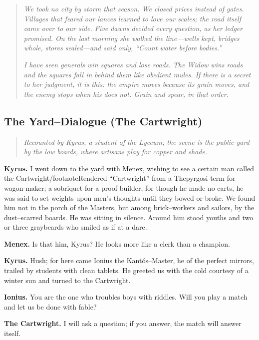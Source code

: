 \documentclass[11pt]{article}
\begin{document}
\begin{quote}
\emph{We took no city by storm that season. We closed prices instead of gates. Villages that feared our lances learned to love our scales; the road itself came over to our side. Five dawns decided every question, as her ledger promised. On the last morning she walked the line—wells kept, bridges whole, stores sealed—and said only, “Count water before bodies.”}

\emph{I have seen generals win squares and lose roads. The Widow wins roads and the squares fall in behind them like obedient mules. If there is a secret to her judgment, it is this: the empire moves because its grain moves, and the enemy stops when his does not. Grain and spear, in that order.}
\end{quote}

\clearpage
\subsection*{The Yard–Dialogue (The Cartwright)}

\begin{quote}\small\itshape
Recounted by Kyrus, a student of the Lyceum; the scene is the public yard by the low boards, where artisans play for copper and shade.
\end{quote}

\noindent\textbf{Kyrus.} I went down to the yard with Menex, wishing to see a certain man called the Cartwright/footnote{Rendered “Cartwright” from a Thepyrgosi term for wagon-maker; a sobriquet for a proof-builder}, for though he made no carts, he was said to set weights upon men’s thoughts until they bowed or broke. We found him not in the porch of the Masters, but among brick–workers and sailors, by the dust–scarred boards. He was sitting in silence. Around him stood youths and two or three graybeards who smiled as if at a dare.

\noindent\textbf{Menex.} Is that him, Kyrus? He looks more like a clerk than a champion.

\noindent\textbf{Kyrus.} Hush; for here came Ionius the Kantós–Master, he of the perfect mirrors, trailed by students with clean tablets. He greeted us with the cold courtesy of a winter sun and turned to the Cartwright.

\noindent\textbf{Ionius.} You are the one who troubles boys with riddles. Will you play a match and let us be done with fable?

\noindent\textbf{The Cartwright.} I will ask a question; if you answer, the match will answer itself.
\end{document}
